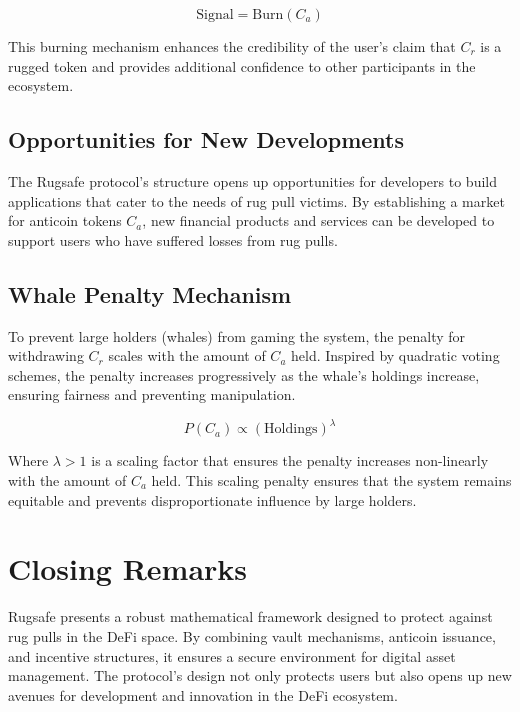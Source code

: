 \documentclass{article}
\begin{document}
\begin{equation}
\text{Signal} = \text{Burn}(C_a)
\end{equation}

This burning mechanism enhances the credibility of the user's claim that $C_r$ is a rugged token and provides additional confidence to other participants in the ecosystem.

\subsection{Opportunities for New Developments}
The Rugsafe protocol's structure opens up opportunities for developers to build applications that cater to the needs of rug pull victims. By establishing a market for anticoin tokens $C_a$, new financial products and services can be developed to support users who have suffered losses from rug pulls.

\subsection{Whale Penalty Mechanism}
To prevent large holders (whales) from gaming the system, the penalty for withdrawing $C_r$ scales with the amount of $C_a$ held. Inspired by quadratic voting schemes, the penalty increases progressively as the whale's holdings increase, ensuring fairness and preventing manipulation.

\begin{equation}
P(C_a) \propto \left(\text{Holdings}\right)^\lambda
\end{equation}

Where $\lambda > 1$ is a scaling factor that ensures the penalty increases non-linearly with the amount of $C_a$ held. This scaling penalty ensures that the system remains equitable and prevents disproportionate influence by large holders.

\section{Closing Remarks}
Rugsafe presents a robust mathematical framework designed to protect against rug pulls in the DeFi space. By combining vault mechanisms, anticoin issuance, and incentive structures, it ensures a secure environment for digital asset management. The protocol's design not only protects users but also opens up new avenues for development and innovation in the DeFi ecosystem.
\end{document}
